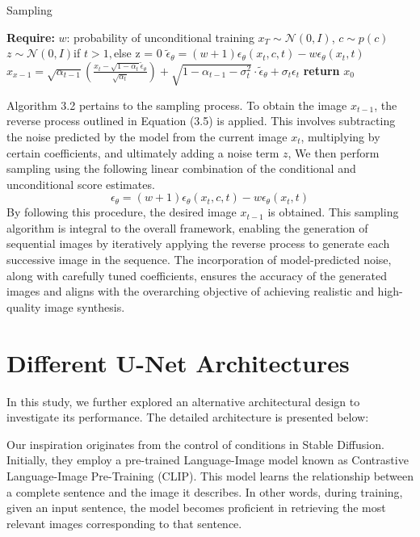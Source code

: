 \begin{algorithm}[H]
\caption{Sampling}
\label{alg:Sampling}
\begin{algorithmic}[1]
\Statex \hspace{-\algorithmicindent} \textbf{Require:} \(w\): probability of unconditional training
\State \(x_{T}\sim\mathcal{N} (0, I)\), \(c \sim \)\(p(c)\)
    \State \(z\sim\mathcal{N}(0, I)\)if \(t > 1,\)else z = 0
    \State \(\tilde\epsilon_\theta = (w + 1)\epsilon_\theta(x_{t},c,t) - w\epsilon_{\theta}(x_t, t)\)
    \State\(x_{x-1} = \sqrt{\alpha_{t-1}}(\frac{x_t - \sqrt{1 - \alpha_{t}}\tilde\epsilon_\theta}{\sqrt{\alpha_t}})+\sqrt{1 - \alpha_{t - 1} - \sigma_{t}^2}\cdot\tilde\epsilon_\theta+\sigma_t\epsilon_t\)
\EndFor
\State \textbf{return} \(x_{0}\)
\end{algorithmic}
\end{algorithm}
Algorithm 3.2 pertains to the sampling process. To obtain the image \(x_{t-1}\), the reverse process outlined in Equation (3.5) is applied. This involves subtracting the noise predicted by the model from the current image \(x_t\), multiplying by certain coefficients, and ultimately adding a noise term \(z\), We then perform sampling using the following linear combination of the conditional and unconditional score estimates\cite{classifier_free}.
\begin{equation}
\epsilon_\theta = (w + 1)\epsilon_\theta(x_{t},c,t) - w\epsilon_{\theta}(x_t, t)
\end{equation}
By following this procedure, the desired image \(x_{t-1}\) is obtained. This sampling algorithm is integral to the overall framework, enabling the generation of sequential images by iteratively applying the reverse process to generate each successive image in the sequence. The incorporation of model-predicted noise, along with carefully tuned coefficients, ensures the accuracy of the generated images and aligns with the overarching objective of achieving realistic and high-quality image synthesis\cite{image_synthesis}.

\section{Different U-Net Architectures}
In this study, we further explored an alternative architectural design to investigate its performance. The detailed architecture is presented below:

Our inspiration originates from the control of conditions in Stable Diffusion. Initially, they employ a pre-trained Language-Image model known as Contrastive Language-Image Pre-Training (CLIP)\cite{CLIP}. This model learns the relationship between a complete sentence and the image it describes. In other words, during training, given an input sentence, the model becomes proficient in retrieving the most relevant images corresponding to that sentence.

